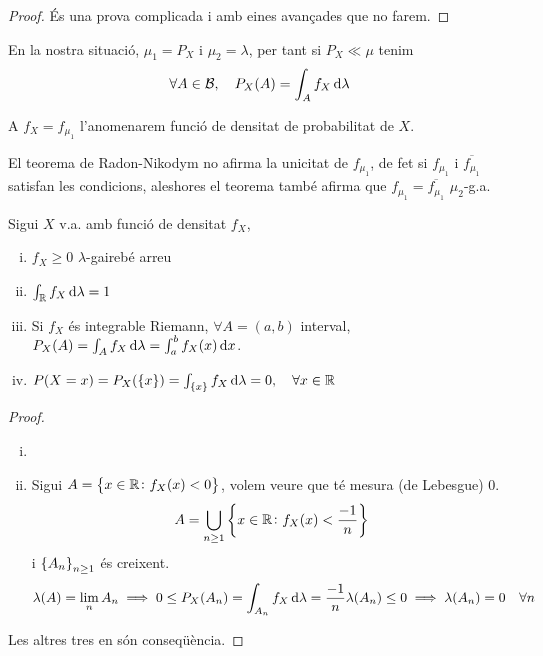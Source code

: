 \begin{proof}
    És una prova complicada i amb eines avançades que no farem.
\end{proof}

\begin{col}
    En la nostra situació, $\mu_1 = P_X$ i $\mu_2 = \lambda$, per tant si $P_X \ll \mu$ tenim
    \[\forall A \in\B,\quad P_X(A) = \int_A f_{X}\dif\lambda\] %
\end{col}

\begin{defi}
    A $f_X = f_{\mu_1}$ l'anomenarem funció de densitat de probabilitat de $X$.
\end{defi}

\begin{obs}
    El teorema de Radon-Nikodym no afirma la unicitat de $f_{\mu_1}$, de fet si $f_{\mu_1}$ i $\overline{f_{\mu_1}}$ satisfan les
    condicions, aleshores el teorema també afirma que $f_{\mu_1} = \overline{f_{\mu_1}}$ $\mu_2$-g.a.
\end{obs}

\begin{prop}
    Sigui $X$ v.a. amb funció de densitat $f_X$,
    \begin{enumerate}[i)]
        \item $f_X \ge 0$ $\lambda$-gairebé arreu
        \item $\int_\real f_X \dif\lambda = 1$
        \item Si $f_X$ és integrable Riemann, $\forall A = (a,b)$ interval, $P_X(A) = \int_A f_X\dif\lambda = \int_a^b f_X(x)\dif x$.
        \item $P(X=x) = P_X(\{x\}) = \int_{\{x\}} f_X \dif\lambda = 0, \quad\forall x\in\real$
    \end{enumerate}
\end{prop}

\begin{proof}
    \begin{enumerate}[i)]
        \item[]
        \item Sigui $A = \left\{ x\in\mathbb{R} \colon f_X(x)<0 \right\}$, volem veure que té mesura (de Lebesgue) 0.
            \[A = \bigcup_{n \ge 1} \left\{ x\in\mathbb{R} \colon f_X(x)<\frac{-1}{n} \right\}\]
            i $\left\{ A_n \right\}_{n \ge 1}$ és creixent.
            \[\lambda(A) = \lim_{n}A_n \implies 0 \le P_X(A_n) = \int_{A_n} f_X \dif\lambda = \frac{-1}{n}\lambda(A_n) \le 0 \implies \lambda(A_n)=0 \quad\forall n\]
    \end{enumerate}
    Les altres tres en són conseqüència.
\end{proof}




















